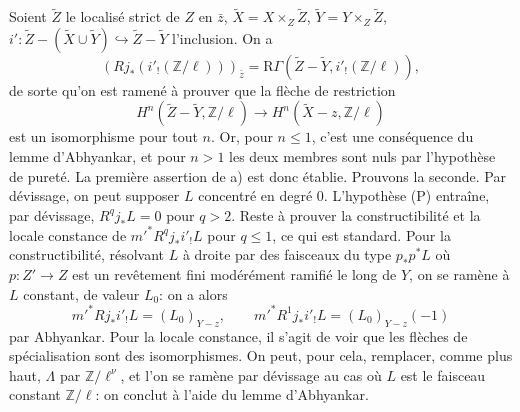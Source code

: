 \documentclass[11pt]{article}
\begin{document}
Soient $\widetilde Z$ le localisé strict de $Z$ en $\bar z$, $\widetilde X=X\times_Z\widetilde Z$, $\widetilde Y=Y\times_Z\widetilde Z$, $i':\widetilde Z-(\widetilde X\cup\widetilde Y)\hookrightarrow \widetilde Z-\widetilde Y$ l'inclusion. On a
\[
(Rj_*(i'_!(\mathbb Z/\ell)))_{\bar z}
=\mathrm R\Gamma(\widetilde Z-\widetilde Y,i'_!(\mathbb Z/\ell)),
\]
de sorte qu'on est ramené à prouver que la flèche de restriction
\[
H^n(\widetilde Z-\widetilde Y,\mathbb Z/\ell)
\longrightarrow
H^n(\widetilde X-z,\mathbb Z/\ell)
\]
est un isomorphisme pour tout $n$. Or, pour $n\le1$, c'est une conséquence du lemme d'Abhyankar, et pour $n>1$ les deux membres sont nuls par l'hypothèse de pureté. La première assertion de a) est donc établie. Prouvons la seconde. Par dévissage, on peut supposer $L$ concentré en degré $0$. L'hypothèse (P) entraîne, par dévissage, $R^qj_*L=0$ pour $q>2$. Reste à prouver la constructibilité et la locale constance de $m'^*R^qj_*i'_!L$ pour $q\le1$, ce qui est standard. Pour la constructibilité, résolvant $L$ à droite par des faisceaux du type $p_*p^*L$ où $p:Z'\to Z$ est un revêtement fini modérément ramifié le long de $Y$, on se ramène à $L$ constant, de valeur $L_0$: on a alors
\[
m'^*Rj_*i'_!L=(L_0)_{Y-z},
\qquad
m'^*R^1j_*i'_!L=(L_0)_{Y-z}(-1)
\]
par Abhyankar. Pour la locale constance, il s'agit de voir que les flèches de spécialisation sont des isomorphismes. On peut, pour cela, remplacer, comme plus haut, $\Lambda$ par $\mathbb Z/\ell^\nu$, et l'on se ramène par dévissage au cas où $L$ est le faisceau constant $\mathbb Z/\ell$: on conclut à l'aide du lemme d'Abhyankar.
\end{document}
